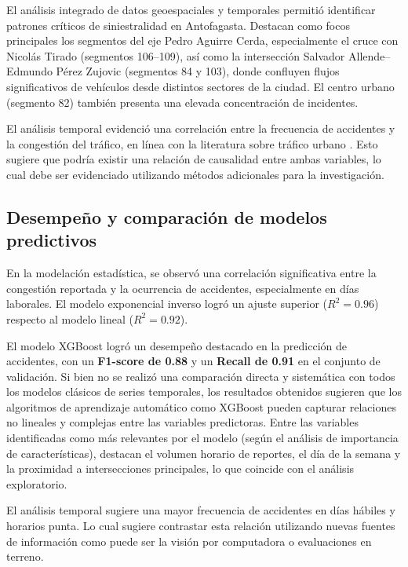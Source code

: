 \documentclass[12pt]{article}
\begin{document}
El análisis integrado de datos geoespaciales y temporales permitió identificar patrones críticos de siniestralidad en Antofagasta. Destacan como focos principales los segmentos del eje Pedro Aguirre Cerda, especialmente el cruce con Nicolás Tirado (segmentos 106–109), así como la intersección Salvador Allende–Edmundo Pérez Zujovic (segmentos 84 y 103), donde confluyen flujos significativos de vehículos desde distintos sectores de la ciudad. El centro urbano (segmento 82) también presenta una elevada concentración de incidentes.

El análisis temporal evidenció una correlación entre la frecuencia de accidentes y la congestión del tráfico, en línea con la literatura sobre tráfico urbano \citep{berhanu2024}. Esto sugiere que podría existir una relación de causalidad entre ambas variables, lo cual debe ser evidenciado utilizando métodos adicionales para la investigación.

\subsection{Desempeño y comparación de modelos predictivos}

En la modelación estadística, se observó una correlación significativa entre la congestión reportada y la ocurrencia de accidentes, especialmente en días laborales. El modelo exponencial inverso logró un ajuste superior ($R^2 = 0.96$) respecto al modelo lineal ($R^2 = 0.92$).

El modelo XGBoost logró un desempeño destacado en la predicción de accidentes, con un \textbf{F1-score de 0.88} y un \textbf{Recall de 0.91} en el conjunto de validación. Si bien no se realizó una comparación directa y sistemática con todos los modelos clásicos de series temporales, los resultados obtenidos sugieren que los algoritmos de aprendizaje automático como XGBoost pueden capturar relaciones no lineales y complejas entre las variables predictoras. Entre las variables identificadas como más relevantes por el modelo (según el análisis de importancia de características), destacan el volumen horario de reportes, el día de la semana y la proximidad a intersecciones principales, lo que coincide con el análisis exploratorio.

El análisis temporal sugiere una mayor frecuencia de accidentes en días hábiles y horarios punta. Lo cual sugiere contrastar esta relación utilizando nuevas fuentes de información como puede ser la visión por computadora o evaluaciones en terreno.
\end{document}
